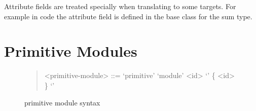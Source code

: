 Attribute fields are treated specially when translating to some targets.
For example in \Cplusplus{} code the attribute field is defined in the base class for the sum type.

\section{Primitive Modules}
\label{sec:primitive-syntax}

\begin{figure}[t]
  \begin{quote}
    \begin{grammar}
      <primitive-module> ::= `primitive' `module' <id> `{' \{ <id> \} `}'
    \end{grammar}%
  \end{quote}%
  \caption{\asdl{} primitive module syntax}
  \label{fig:prim-module-syntax}
\end{figure}%

